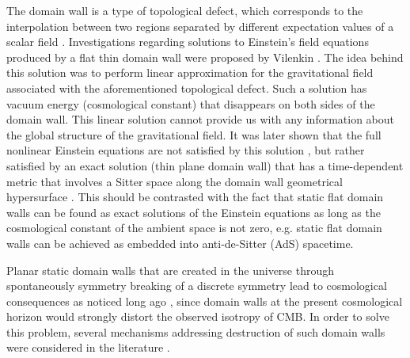 \documentclass[aps,12pt, a4paper,nofootinbib]{revtex4}
\begin{document}
The domain wall is a type of topological defect, which corresponds to the interpolation between two regions separated by different expectation values of a scalar field \cite{Cvetic:1993xe}. Investigations regarding solutions to Einstein's field equations produced by a flat thin domain wall were proposed by Vilenkin \cite{Vilenkin:1981zs}. The idea behind this solution was to perform linear approximation for the gravitational field associated with the aforementioned topological defect. Such a solution has vacuum energy (cosmological constant) that disappears on both sides of the domain wall. This linear solution cannot provide us with any information about the global structure of the gravitational field. It was later shown that the full nonlinear Einstein equations are not satisfied by this solution \cite{Dolgov:1988qw}, but rather satisfied by an exact solution (thin plane domain wall) that has a time-dependent metric that involves a Sitter space along the domain wall geometrical hypersurface \cite{Vilenkin:1984hy}. This should be contrasted with the fact that static flat domain walls can be found as exact solutions of the Einstein equations as long as the cosmological constant of the ambient space is not zero, e.g. static flat domain walls can be achieved as embedded into anti-de-Sitter (AdS) spacetime. {Planar static domain walls that are created in the universe through spontaneously symmetry breaking of a discrete symmetry \cite{Lee} lead to cosmological consequences as noticed long ago \cite{Zeldovich}, since domain walls at the present cosmological horizon would strongly distort the observed isotropy of CMB. In order to solve this problem, several mechanisms addressing destruction of such domain walls were considered in the literature \cite{Kuzmin,Kuzmin1,Kuzmin2,Kuzmin3}.

}
\end{document}
